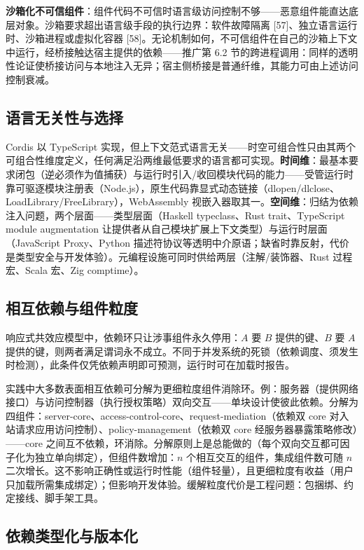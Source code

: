 \documentclass[11pt,a4paper]{article}
\theoremstyle{plain}
\theoremstyle{definition}
\theoremstyle{remark}
\begin{document}
\textbf{沙箱化不可信组件}：组件代码不可信时语言级访问控制不够——恶意组件能直达底层对象。沙箱要求超出语言级手段的执行边界：软件故障隔离 [57]、独立语言运行时、沙箱进程或虚拟化容器 [58]。无论机制如何，不可信组件在自己的沙箱上下文中运行，经桥接触达宿主提供的依赖——推广第 6.2 节的跨进程调用：同样的透明性论证使桥接访问与本地注入无异；宿主侧桥接是普通纤维，其能力可由上述访问控制衰减。

\subsection{语言无关性与选择}

Cordis 以 TypeScript 实现，但上下文范式语言无关——时空可组合性只由其两个可组合性维度定义，任何满足沿两维最低要求的语言都可实现。\textbf{时间维}：最基本要求闭包（逆必须作为值捕获）与运行时引入/收回模块代码的能力——受管运行时靠可驱逐模块注册表（Node.js），原生代码靠显式动态链接（dlopen/dlclose、LoadLibrary/FreeLibrary），WebAssembly 视嵌入器取其一。\textbf{空间维}：归结为依赖注入问题，两个层面——类型层面（Haskell typeclass、Rust trait、TypeScript module augmentation 让提供者从自己模块扩展上下文类型）与运行时层面（JavaScript Proxy、Python 描述符协议等透明中介原语；缺省时靠反射，代价是类型安全与开发体验）。元编程设施可同时供给两层（注解/装饰器、Rust 过程宏、Scala 宏、Zig comptime）。

\subsection{相互依赖与组件粒度}

响应式共效应模型中，依赖环只让涉事组件永久停用：$A$ 要 $B$ 提供的键、$B$ 要 $A$ 提供的键，则两者满足谓词永不成立。不同于并发系统的死锁（依赖调度、须发生时检测），此条件仅凭依赖声明即可预测，运行时可在加载时报告。

实践中大多数表面相互依赖可分解为更细粒度组件消除环。例：服务器（提供网络接口）与访问控制器（执行授权策略）双向交互——单块设计使彼此依赖。分解为四组件：server-core、access-control-core、request-mediation（依赖双 core 对入站请求应用访问控制）、policy-management（依赖双 core 经服务器暴露策略修改）——core 之间互不依赖，环消除。分解原则上是总能做的（每个双向交互都可因子化为独立单向绑定），但组件数增加：$n$ 个相互交互的组件，集成组件数可随 $n$ 二次增长。这不影响正确性或运行时性能（组件轻量），且更细粒度有收益（用户只加载所需集成绑定）；但影响开发体验。缓解粒度代价是工程问题：包捆绑、约定接线、脚手架工具。

\subsection{依赖类型化与版本化}
\end{document}
